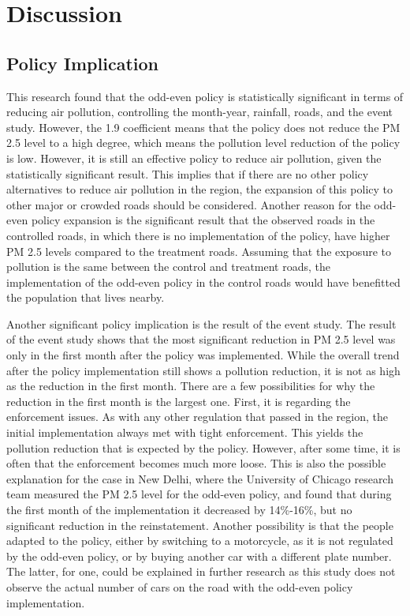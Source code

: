 \documentclass[AEJ]{AEA}
\begin{document}
\section{Discussion}
\subsection{Policy Implication}
This research found that the odd-even policy is statistically
significant in terms of reducing air pollution, controlling the
month-year, rainfall, roads, and the event study. However, the 1.9
coefficient means that the policy does not reduce the PM 2.5 level to a
high degree, which means the pollution level reduction of the policy is
low. However, it is still an effective policy to reduce air pollution,
given the statistically significant result. This implies that if there
are no other policy alternatives to reduce air pollution in the region,
the expansion of this policy to other major or crowded roads should be
considered. Another reason for the odd-even policy expansion is the
significant result that the observed roads in the controlled roads, in
which there is no implementation of the policy, have higher PM 2.5
levels compared to the treatment roads. Assuming that the exposure to
pollution is the same between the control and treatment roads, the
implementation of the odd-even policy in the control roads would have
benefitted the population that lives nearby.

Another significant policy implication is the result of the event study.
The result of the event study shows that the most significant reduction
in PM 2.5 level was only in the first month after the policy was
implemented. While the overall trend after the policy implementation
still shows a pollution reduction, it is not as high as the reduction in
the first month. There are a few possibilities for why the reduction in
the first month is the largest one. First, it is regarding the
enforcement issues. As with any other regulation that passed in the
region, the initial implementation always met with tight enforcement.
This yields the pollution reduction that is expected by the policy.
However, after some time, it is often that the enforcement becomes much
more loose. This is also the possible explanation for the case in New
Delhi, where the University of Chicago research team measured the PM 2.5
level for the odd-even policy, and found that during the first month of
the implementation it decreased by 14\%-16\%, but no significant
reduction in the reinstatement. Another possibility is that the people
adapted to the policy, either by switching to a motorcycle, as it is not
regulated by the odd-even policy, or by buying another car with a
different plate number. The latter, for one, could be explained in
further research as this study does not observe the actual number of
cars on the road with the odd-even policy implementation.~
\end{document}
